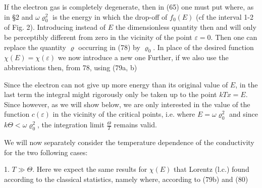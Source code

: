 \begin{paper}{1}
If the electron gas is completely degenerate, then in (65) one must put
where, as in \S2
and $\omega\varrho_0^2$ is the energy in which the drop-off of $f_0(E)$ (cf the interval 1-2 of Fig. 2). Introducing instead of $E$ the dimensionless quantity
then 
and
will only be perceptibly different from zero in the vicinity of the point $\varepsilon=0$. Then one can replace the quantity $\varrho$ occurring in (78) by $\varrho_0$. In place of the desired function $\chi(E)=\chi(\varepsilon)$ we now introduce a new one
Further, if we also use the abbreviations
then, from 78, using (79a, b)

Since the electron can not give up more energy than its original value of $E$, in the last term the integral might rigorously only be taken up to the point $kTx=E$. Since however, as we will show below, we are only interested in the value of the function $c(\varepsilon)$ in the vicinity of the critical points, i.e. where $E=\omega\varrho_0^2$ and since $k\Theta<\omega\varrho_0^2$, the integration limit $\frac{\Theta}{T}$ remains valid.

We will now separately consider the temperature dependence of the conductivity for the two following cases:

1. $T\gg\Theta$. Here we expect the same results for $\chi(E)$ that Lorentz (l.c.) found according to the classical statistics, namely
where, according to (79b) and (80)


\end{paper}
